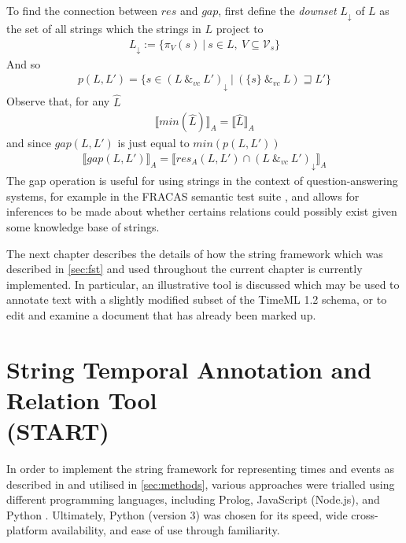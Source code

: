 \documentclass[a4paper,12pt,leqno]{article}
\newcommand{\spvc}{~\&_{v\!c}~}
\newcommand{\V}{\mathcal{V}}
\begin{document}
To find the connection between $res$ and $gap$, first define the \textit{downset} $L_\downarrow$ of $L$ as the set of all strings which the strings in $L$ project to
\begin{align}
	L_\downarrow := \{ \pi_V(s) ~|~ s \in L,~ V \subseteq \V_s \}
\end{align}
And so
\begin{align}
	p(L, L') = \{s \in (L \spvc L')_\downarrow ~|~ (\{s\} \spvc L) \sqsupseteq L'\}
\end{align}
Observe that, for any $\hat{L}$
\begin{align}
	\llbracket min(\hat{L}) \rrbracket_A = \llbracket \hat{L} \rrbracket_A
\end{align}
and since $gap(L, L')$ is just equal to $min(p(L, L'))$
\begin{align}
	\llbracket gap(L, L') \rrbracket_A = \llbracket res_A(L, L') \cap (L \spvc L')_\downarrow \rrbracket_A
\end{align}
The gap operation is useful for using strings in the context of question-answering systems, for example in the FRACAS semantic test suite \citep{cooper1996using}, and allows for inferences to be made about whether certains relations could possibly exist given some knowledge base of strings.

The next chapter describes the details of how the string framework which was described in \cref{sec:fst} and used throughout the current chapter is currently implemented. In particular, an illustrative tool is discussed which may be used to annotate text with a slightly modified subset of the TimeML 1.2 \citep{timeml2005timeml} schema, or to edit and examine a document that has already been marked up.
\newpage
\section[String Temporal Annotation and Relation Tool (START)]{String Temporal Annotation and Relation Tool\\(START)}\label{sec:implementation}


In order to implement the string framework for representing times and events as described in  and utilised in \cref{sec:methods}, various approaches were trialled using different programming languages, including Prolog, JavaScript (Node.js), and Python \citep[see][respectively for more on each]{clocksin2012programming,tilkov2010node,kuhlman2009python}. Ultimately, Python (version 3) was chosen for its speed, wide cross-platform availability, and ease of use through familiarity.
\end{document}
